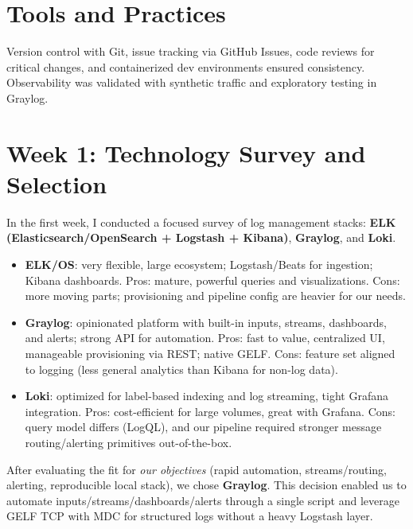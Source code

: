 \documentclass[12pt,a4paper]{report}
\begin{document}
\section{Tools and Practices}
Version control with Git, issue tracking via GitHub Issues, code reviews for critical changes, and containerized dev environments ensured consistency. Observability was validated with synthetic traffic and exploratory testing in Graylog.

\section{Week 1: Technology Survey and Selection}
In the first week, I conducted a focused survey of log management stacks: \textbf{ELK (Elasticsearch/OpenSearch + Logstash + Kibana)}, \textbf{Graylog}, and \textbf{Loki}.
\begin{itemize}[leftmargin=1.2cm]
  \item \textbf{ELK/OS}: very flexible, large ecosystem; Logstash/Beats for ingestion; Kibana dashboards. Pros: mature, powerful queries and visualizations. Cons: more moving parts; provisioning and pipeline config are heavier for our needs.
  \item \textbf{Graylog}: opinionated platform with built-in inputs, streams, dashboards, and alerts; strong API for automation. Pros: fast to value, centralized UI, manageable provisioning via REST; native GELF. Cons: feature set aligned to logging (less general analytics than Kibana for non-log data).
  \item \textbf{Loki}: optimized for label-based indexing and log streaming, tight Grafana integration. Pros: cost-efficient for large volumes, great with Grafana. Cons: query model differs (LogQL), and our pipeline required stronger message routing/alerting primitives out-of-the-box.
\end{itemize}
After evaluating the fit for \textit{our objectives} (rapid automation, streams/routing, alerting, reproducible local stack), we chose \textbf{Graylog}. This decision enabled us to automate inputs/streams/dashboards/alerts through a single script and leverage GELF TCP with MDC for structured logs without a heavy Logstash layer.
\end{document}
